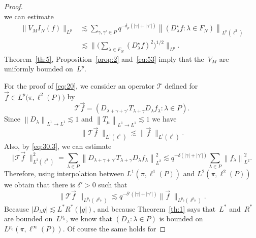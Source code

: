 \documentclass[a4paper]{amsart}
\newcommand{\norm}[1]{{\left\lVert #1 \right\rVert}}
\newcommand{\abs}[1]{{\lvert {#1} \rvert}}
\newcommand{\pnorm}[2]{{\norm{{#1}}_{L^{#2} \rightarrow L^{#2}}}}
\newcommand{\lell}[2]{L^{#1}\left(\pi, \ell^{#2}(P) \right)}
\newcommand{\seq}[2]{\left({#1}: {#2}\right)}
\theoremstyle{plain}
\theoremstyle{definition}
\theoremstyle{remark}
\numberwithin{equation}{section}
\theoremstyle{plain}
\begin{document}
\begin{proof}
\begin{equation}
\end{equation}
we can estimate
\begin{equation}
\begin{aligned}
  \label{eq:53}
  \big\lVert
  V_M I_N(f)
  \big\rVert_{L^p} 
  & \lesssim 
  \sum_{\gamma, \gamma' \in P} q^{-\delta_p(\abs{\gamma} + \abs{\gamma'})}
  \norm{\seq{D_\lambda^\star f}{\lambda \in F_N}}_{L^p(\ell^2)} \\
  & \lesssim
  \Big\lVert 
  \Big(\sum_{\lambda \in F_N} (D_\lambda^\star f)^2\Big)^{1/2}
  \Big\rVert_{L^p}.
\end{aligned}
\end{equation}
Theorem~\ref{th:5}, Proposition~\ref{prop:2} and~\eqref{eq:53} imply
that the~$V_M$ are uniformly bounded on~$L^p$.
	
For the proof of \eqref{eq:20}, we consider an operator $\mathcal{T}$
defined for $\vec{f} \in L^p\big(\pi, \ell^2(P)\big)$ by
\begin{equation*}
  \mathcal{T} {\vec f} = \seq{D_{\lambda+\gamma+\gamma'} 
  T_{\lambda+\gamma} D_\lambda f_\lambda}{\lambda \in P}.
\end{equation*}
Since $\pnorm{D_\lambda}{1} \lesssim 1$ and $\pnorm{T_\mu}{1} \lesssim 1$ we have
\begin{equation*}
    \big\lVert \mathcal{T} {\vec f\;}
    \big\rVert_{L^1(\ell^1)} \lesssim 
    \big\lVert \vec f\; \big\rVert_{L^1(\ell^1)}.
\end{equation*}
Also, by \eqref{eq:30.3}, we can estimate
\begin{equation*}
    \big\Vert 
    \mathcal{T} \vec f\;
    \big\rVert_{L^2(\ell^2)}^2
    = 
    \sum_{\lambda \in P} \norm{D_{\lambda+\gamma+\gamma'} T_{\lambda+\gamma} 
    D_\lambda f_\lambda}_{L^2}^2
    \lesssim
    q^{-\delta (\abs{\gamma}+\abs{\gamma'})} \sum_{\lambda \in P} \norm{f_\lambda}_{L^2}^2.
\end{equation*}
Therefore, using interpolation between $\lell{1}{1}$ and $\lell{2}{2}$
we obtain that there is $\delta' > 0$ such that
\begin{equation*}
  \big\lVert
  \mathcal{T} {\vec f}\;
  \big\rVert_{L^{p_0}(\ell^{p_0})} \lesssim q^{-\delta' (\abs{\gamma}+\abs{\gamma'})} 
  \big\lVert
  \vec f\;
  \big\rVert_{L^{p_0}(\ell^{p_0})}.
\end{equation*}
Because $\abs{D_\lambda g} \lesssim L^* R^*( \abs{g} )$, and because
Theorem~\ref{th:1} says that~$L^*$ and~$R^*$ are bounded on~$L^{p_0}$,
we know that $\seq{D_\lambda}{\lambda \in P}$ is bounded
on~$L^{p_0}(\pi, \ell^\infty(P))$.  Of course the same holds for

\end{proof}
\end{document}
